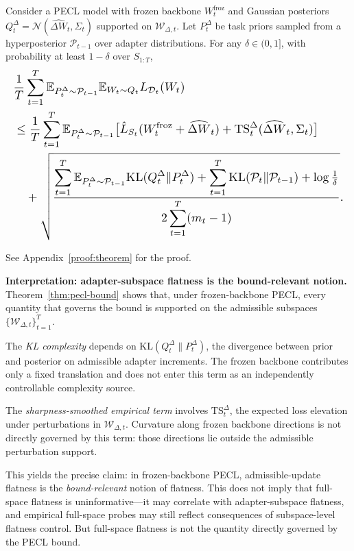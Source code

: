 \begin{theorem}
\label{thm:pecl-bound}
Consider a PECL model with frozen backbone $W_t^{\mathrm{froz}}$ and Gaussian posteriors $Q_t^\Delta = \mathcal{N}(\widehat{\Delta W}_t, \Sigma_t)$ supported on $\mathcal{W}_{\Delta,t}$.
Let $P_t^\Delta$ be task priors sampled from a hyperposterior $\mathcal{P}_{t-1}$ over adapter distributions.
For any $\delta \in (0,1]$, with probability at least $1 - \delta$ over $S_{1:T}$,
\begin{equation*}
\resizebox{\linewidth}{!}{$
\begin{aligned}
&\frac{1}{T}\sum_{t=1}^T \mathbb{E}_{P_t^\Delta \sim \mathcal{P}_{t-1}} \mathbb{E}_{W_t \sim Q_t} L_{\mathcal{D}_t}(W_t) \\
&\leq
\frac{1}{T}\sum_{t=1}^T \mathbb{E}_{P_t^\Delta \sim \mathcal{P}_{t-1}}
\bigl[
\hat{L}_{S_t}(W_t^{\mathrm{froz}} + \widehat{\Delta W}_t)
+ \mathrm{TS}_t^\Delta(\widehat{\Delta W}_t, \Sigma_t)
\bigr] \\
&\quad +
\sqrt{
\frac{
\displaystyle\sum_{t=1}^T \mathbb{E}_{P_t^\Delta \sim \mathcal{P}_{t-1}}
\mathrm{KL}(Q_t^\Delta \| P_t^\Delta)
+ \sum_{t=1}^T \mathrm{KL}(\mathcal{P}_t \| \mathcal{P}_{t-1})
+ \log\tfrac{1}{\delta}
}{2\displaystyle\sum_{t=1}^T (m_t - 1)}
}.
\end{aligned}
$}
\end{equation*}
\end{theorem}

See Appendix~\ref{proof:theorem} for the proof.

\textbf{Interpretation: adapter-subspace flatness is the bound-relevant notion.}
Theorem~\ref{thm:pecl-bound} shows that, under frozen-backbone PECL, every quantity that governs the bound is supported on the admissible subspaces $\{\mathcal{W}_{\Delta,t}\}_{t=1}^T$.

The \emph{KL complexity} depends on $\mathrm{KL}(Q_t^\Delta \| P_t^\Delta)$, the divergence between prior and posterior on admissible adapter increments.
The frozen backbone contributes only a fixed translation and does not enter this term as an independently controllable complexity source.

The \emph{sharpness-smoothed empirical term} involves $\mathrm{TS}_t^\Delta$, the expected loss elevation under perturbations in $\mathcal{W}_{\Delta,t}$.
Curvature along frozen backbone directions is not directly governed by this term: those directions lie outside the admissible perturbation support.

This yields the precise claim: in frozen-backbone PECL, admissible-update flatness is the \emph{bound-relevant} notion of flatness.
This does not imply that full-space flatness is uninformative---it may correlate with adapter-subspace flatness, and empirical full-space probes may still reflect consequences of subspace-level flatness control.
But full-space flatness is not the quantity directly governed by the PECL bound.

